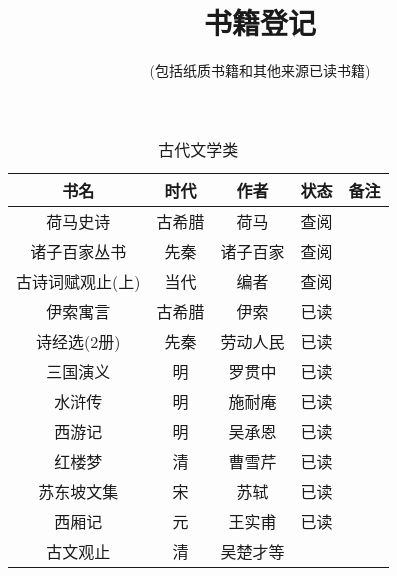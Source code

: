 \documentclass[UTF8,12pt]{ctexart}
\begin{document}
\title{{\Huge \textbf {书籍登记}}}
\author{(包括纸质书籍和其他来源已读书籍)}
\maketitle

\begin{table}[h]
\centering
\begin{tabular}{ccccc}
\toprule
书名&时代&作者&状态&备注\\
\midrule
荷马史诗&古希腊&荷马&查阅\\
诸子百家丛书&先秦&诸子百家&查阅\\
古诗词赋观止(上)&当代&编者&查阅\\
伊索寓言&古希腊&伊索&已读\\
诗经选(2册)&先秦&劳动人民&已读\\
三国演义&明&罗贯中&已读\\
水浒传&明&施耐庵&已读\\
西游记&明&吴承恩&已读\\
红楼梦&清&曹雪芹&已读\\
苏东坡文集&宋&苏轼&已读\\
西厢记&元&王实甫&已读\\
古文观止&清&吴楚才等\\
\bottomrule
\end{tabular}
\caption{古代文学类}
\end{table}
\end{document}
